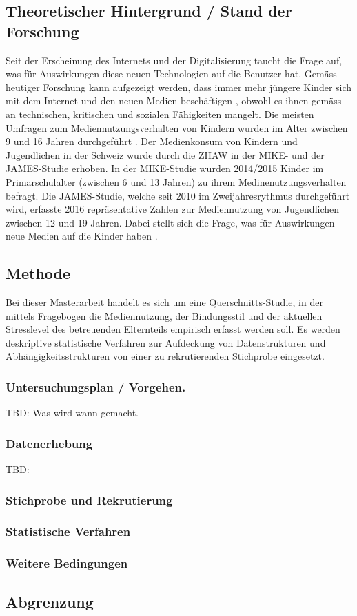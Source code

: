 \subsection{Theoretischer Hintergrund / Stand der Forschung}
Seit der Erscheinung des Internets und der Digitalisierung taucht die Frage auf, was für Auswirkungen diese neuen Technologien auf die Benutzer hat. Gemäss heutiger Forschung kann aufgezeigt werden, dass immer mehr jüngere Kinder sich mit dem Internet und den neuen Medien beschäftigen \cite{Chaudron2015}, obwohl es ihnen gemäss  an technischen, kritischen und sozialen Fähigkeiten mangelt.
Die meisten Umfragen zum Mediennutzungsverhalten von Kindern wurden im Alter zwischen 9 und 16 Jahren durchgeführt \cite{Chaudron2015}. Der Medienkonsum von Kindern und Jugendlichen in der Schweiz wurde durch die ZHAW in der MIKE- und der JAMES-Studie \cite{Suter2015, Waller2016} erhoben. In der MIKE-Studie wurden 2014/2015 Kinder im Primarschulalter (zwischen 6 und 13 Jahren) zu ihrem Medinenutzungsverhalten befragt. Die JAMES-Studie, welche seit 2010 im Zweijahresrythmus durchgeführt wird, erfasste 2016 repräsentative Zahlen zur Mediennutzung von Jugendlichen zwischen 12 und 19 Jahren. 
Dabei stellt sich die Frage, was für Auswirkungen neue Medien auf die Kinder haben \cite{Livingstone2015}.  


\subsection{Methode}
Bei dieser Masterarbeit handelt es sich um eine Querschnitts-Studie, in der mittels Fragebogen die Mediennutzung, der Bindungsstil und der aktuellen Stresslevel des betreuenden Elternteils empirisch erfasst werden soll. 
Es werden deskriptive statistische Verfahren zur Aufdeckung von Datenstrukturen und Abhängigkeitsstrukturen von einer zu rekrutierenden Stichprobe eingesetzt.
\subsubsection{Untersuchungsplan / Vorgehen.}
TBD: Was wird wann gemacht.
\subsubsection{Datenerhebung}
TBD: 
\subsubsection{Stichprobe und Rekrutierung}
\subsubsection{Statistische Verfahren}
\subsubsection{Weitere Bedingungen}
\subsection{Abgrenzung}
